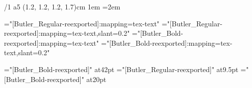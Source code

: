 \shyph %

%
%
\margins/1 a5 (1.2, 1.2, 1.2, 1.7)cm
\parindent 1em %
\emergencystretch=2em %

\hyperlinks{\Blue}{\Blue} %
\font\tenrm="[Butler_Regular-reexported]:mapping=tex-text"
\font\tenit="[Butler_Regular-reexported]:mapping=tex-text,slant=0.2"
\font\tenbf="[Butler_Bold-reexported]:mapping=tex-text"
\font\tenbi="[Butler_Bold-reexported]:mapping=tex-text,slant=0.2"
\typosize[10/12.5]%

\font\ftitle="[Butler_Bold-reexported]" at42pt
\font\ffootertitle="[Butler_Regular-reexported]" at9.5pt
\def\fissuemonth{\ftitle}
\font\fissueyear="[Butler_Bold-reexported]" at20pt

\def\monthname#1{%
\ifcase#1
\or január%
\or február%
\or marec%
\or apríl%
\or máj%
\or jún%
\or júl%
\or august%
\or september%
\or október%
\or november%
\or december%
\fi}
\def\nazovmesiaca{\monthname\cislomesiaca}

